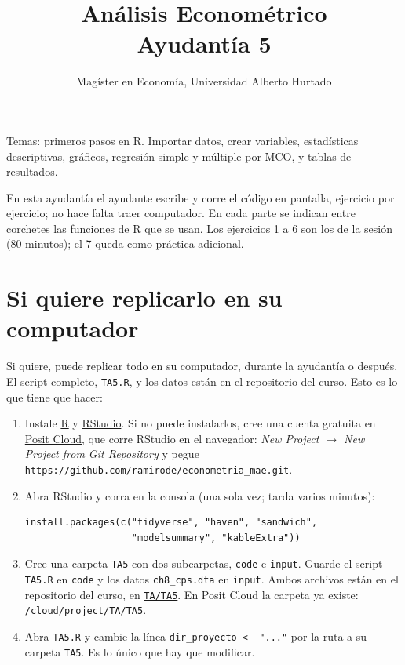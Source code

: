 \documentclass[letterpaper,11pt]{article}
\title{Análisis Econométrico \\ Ayudantía 5}
\author{Magíster en Economía, Universidad Alberto Hurtado}
\date{}
\begin{document}
\maketitle

\noindent Temas: primeros pasos en R. Importar datos, crear variables, estadísticas
descriptivas, gráficos, regresión simple y múltiple por MCO, y tablas de resultados.

\medskip
\noindent En esta ayudantía el ayudante escribe y corre el código en pantalla, ejercicio por
ejercicio; no hace falta traer computador. En cada parte se indican entre corchetes las
funciones de R que se usan. Los ejercicios 1 a 6 son los de la sesión (80 minutos); el 7 queda
como práctica adicional.

\section*{Si quiere replicarlo en su computador}

\noindent Si quiere, puede replicar todo en su computador, durante la ayudantía o después. El
script completo, \texttt{TA5.R}, y los datos están en el repositorio del curso. Esto es lo que
tiene que hacer:

\begin{enumerate}[itemsep=0.4em]
    \item Instale \href{https://cran.r-project.org}{R} y
          \href{https://posit.co/download/rstudio-desktop/}{RStudio}. Si no puede instalarlos,
          cree una cuenta gratuita en \href{https://posit.cloud}{Posit Cloud}, que corre RStudio
          en el navegador: \emph{New Project $\to$ New Project from Git Repository} y pegue
          \texttt{https://github.com/ramirode/econometria\_mae.git}.
    \item Abra RStudio y corra en la consola (una sola vez; tarda varios minutos):
\begin{verbatim}
install.packages(c("tidyverse", "haven", "sandwich",
                   "modelsummary", "kableExtra"))
\end{verbatim}
    \item Cree una carpeta \texttt{TA5} con dos subcarpetas, \texttt{code} e \texttt{input}.
          Guarde el script \texttt{TA5.R} en \texttt{code} y los datos \texttt{ch8\_cps.dta} en
          \texttt{input}. Ambos archivos están en el repositorio del curso, en
          \href{https://github.com/ramirode/econometria_mae/tree/main/TA/TA5}{\texttt{TA/TA5}}.
          En Posit Cloud la carpeta ya existe: \texttt{/cloud/project/TA/TA5}.
    \item Abra \texttt{TA5.R} y cambie la línea \texttt{dir\_proyecto <- "..."} por la ruta a
          su carpeta \texttt{TA5}. Es lo único que hay que modificar.
\end{enumerate}
\end{document}
